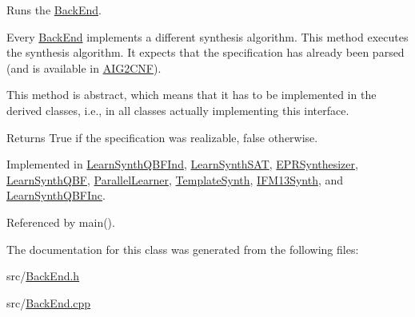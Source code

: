 Runs the \hyperlink{classBackEnd}{Back\-End}. 

Every \hyperlink{classBackEnd}{Back\-End} implements a different synthesis algorithm. This method executes the synthesis algorithm. It expects that the specification has already been parsed (and is available in \hyperlink{classAIG2CNF}{A\-I\-G2\-C\-N\-F}).

This method is abstract, which means that it has to be implemented in the derived classes, i.\-e., in all classes actually implementing this interface.

\begin{DoxyReturn}{Returns}
True if the specification was realizable, false otherwise. 
\end{DoxyReturn}


Implemented in \hyperlink{classLearnSynthQBFInd_a6709343a109f82c427dcbc4a576d9c03}{Learn\-Synth\-Q\-B\-F\-Ind}, \hyperlink{classLearnSynthSAT_a13a50b2649f44d37761fdbff26e9c0c0}{Learn\-Synth\-S\-A\-T}, \hyperlink{classEPRSynthesizer_ab5eb613a7e5e4f8d408938531f745e4e}{E\-P\-R\-Synthesizer}, \hyperlink{classLearnSynthQBF_aed85bb2fe317a5fdc7eef71fe598c606}{Learn\-Synth\-Q\-B\-F}, \hyperlink{classParallelLearner_a93acb74e7c8504d0ef2bd3697441b745}{Parallel\-Learner}, \hyperlink{classTemplateSynth_a5ad9855736c7d4dfdec08280d2424f80}{Template\-Synth}, \hyperlink{classIFM13Synth_a42adb4f76d88199d92b1bedb58a139f8}{I\-F\-M13\-Synth}, and \hyperlink{classLearnSynthQBFInc_af9563d1f3c657ed4730ee49e041bc300}{Learn\-Synth\-Q\-B\-F\-Inc}.



Referenced by main().



The documentation for this class was generated from the following files\-:\begin{DoxyCompactItemize}
\item 
src/\hyperlink{BackEnd_8h}{Back\-End.\-h}\item 
src/\hyperlink{BackEnd_8cpp}{Back\-End.\-cpp}\end{DoxyCompactItemize}
